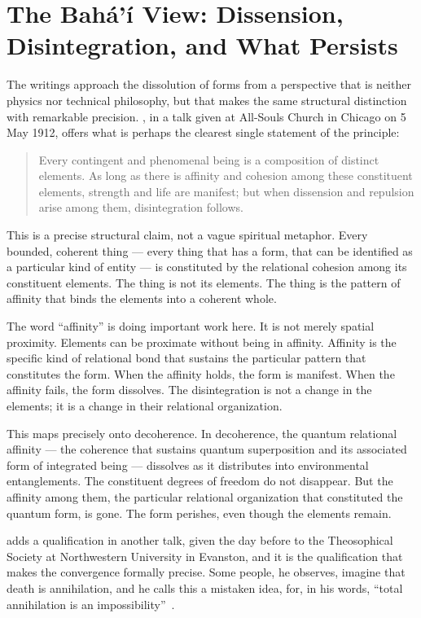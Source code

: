 \section{The Bahá'í View: Dissension, Disintegration, and What Persists}
\label{sec:ch10-bahai}

The \bahai writings approach the dissolution of forms from a perspective that is neither physics nor technical philosophy, but that makes the same structural distinction with remarkable precision.
\AbdulBaha, in a talk given at All-Souls Church in Chicago on 5 May 1912, offers what is perhaps the clearest single statement of the principle:

\begin{quote}
Every contingent and phenomenal being is a composition of distinct elements.
As long as there is affinity and cohesion among these constituent elements, strength and life are manifest; but when dissension and repulsion arise among them, disintegration follows.~\citep[Talk 41]{PUP}
\end{quote}

This is a precise structural claim, not a vague spiritual metaphor.
Every bounded, coherent thing --- every thing that has a form, that can be identified as a particular kind of entity --- is constituted by the relational cohesion among its constituent elements.
The thing is not its elements.
The thing is the pattern of affinity that binds the elements into a coherent whole.

The word ``affinity'' is doing important work here.
It is not merely spatial proximity.
Elements can be proximate without being in affinity.
Affinity is the specific kind of relational bond that sustains the particular pattern that constitutes the form.
When the affinity holds, the form is manifest.
When the affinity fails, the form dissolves.
The disintegration is not a change in the elements; it is a change in their relational organization.

This maps precisely onto decoherence.
In decoherence, the quantum relational affinity --- the coherence that sustains quantum superposition and its associated form of integrated being --- dissolves as it distributes into environmental entanglements.
The constituent degrees of freedom do not disappear.
But the affinity among them, the particular relational organization that constituted the quantum form, is gone.
The form perishes, even though the elements remain.

\AbdulBaha adds a qualification in another talk, given the day before to the Theosophical Society at Northwestern University in Evanston, and it is the qualification that makes the convergence formally precise.
Some people, he observes, imagine that death is annihilation, and he calls this a mistaken idea, for, in his words, ``total annihilation is an impossibility''~\citep[Talk 38]{PUP}.

